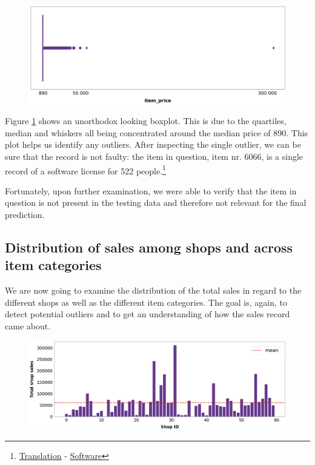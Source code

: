 \begin{figure}[h]
  \centering
  \includegraphics[width=0.78\linewidth]{external_content/graphs/outliers-item_price.png}
  \captionsetup{justification=centering}
  \label{fig:item_price_outliers}
\end{figure}

\vspace*{-4mm}
Figure \ref{fig:item_price_outliers} shows an unorthodox looking boxplot. This is due to the quartiles, median and whiskers all being concentrated around the median price of 890. This plot helps us identify any outliers. After inspecting the single outlier, we can be sure that the record is not faulty: the item in question, item nr. 6066, is a single record of a software license for 522 people.\footnote{\href{https://translate.google.com/?sl=ru&tl=en&text=Radmin\%203\%20\%20-\%20522\%20\%D0\%BB\%D0\%B8\%D1\%86.&op=translate }{Translation} - \href{https://www.radmin.com/ordering/}{Software}}

Fortunately, upon further examination, we were able to verify that the item in question is not present in the testing data and therefore not relevant for the final prediction.

\subsection{Distribution of sales among shops and across item categories}

We are now going to examine the distribution of the total sales in regard to the different shops as well as the different item categories. The goal is, again, to detect potential outliers and to get an understanding of how the sales record came about.

\begin{figure}[h]
  \centering
  \includegraphics[width=0.78\linewidth]{external_content/graphs/distribution_amongst_shops.png}
  \captionsetup{justification=centering}
  \label{fig:distribution_amongst_shops}
\end{figure}

